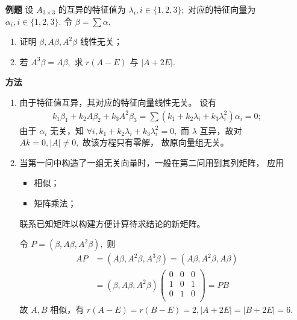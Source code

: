 \begin{itemize}
    \item[\textbf{例题}] 设 $ A_{3\times 3} $ 的互异的特征值为 $ \lambda_i,i\in\{1,2,3\}; $ 
    对应的特征向量为 $ \alpha_i,i\in\{1,2,3\}. $ 令 $ \beta = \sum \alpha, $ 
    \begin{enumerate}[label = \Roman*.]
        \item 证明 $ \beta,A\beta,A^2\beta $ 线性无关；
        \item 若 $ A^3\beta = A\beta, $ 求 $ r(A - E) $ 与 $ |A+2E|. $ 
    \end{enumerate}
    \item[\textbf{方法}] \begin{enumerate}[label = \Roman*.]
        \item 由于特征值互异，其对应的特征向量线性无关。
        设有
        \begin{equation*}
            \begin{aligned}
                k_1\beta_1 + k_2A\beta_2 + k_3A^2\beta_3
                = \sum(k_1 + k_2\lambda_i + k_3\lambda_i^2)\alpha_i = 0;
            \end{aligned}
        \end{equation*}
        由于 $ \alpha_i $ 无关，知 $ \forall i, k_1 + k_2\lambda_i + k_3\lambda_i^2 = 0, $ 
        而 $ \lambda $ 互异，故对 $ Ak = 0, |A|\neq 0, $ 故该方程只有零解，
        故原向量组无关。
        \item 当第一问中构造了一组无关向量时，一般在第二问用到其列矩阵，
        应用\begin{itemize}
            \item 相似；
            \item 矩阵乘法；
        \end{itemize}联系已知矩阵以构建方便计算待求结论的新矩阵。

        令 $ P = (\beta,A\beta,A^2\beta), $ 则
        \begin{equation*}
            \begin{aligned}
                AP &= (A\beta,A^2\beta,A^3\beta) = (A\beta,A^2\beta,A\beta) \\ 
                &= (\beta,A\beta,A^2\beta)\begin{pmatrix}
                    0&0&0\\1&0&1\\0&1&0\\
                \end{pmatrix} = PB
            \end{aligned}
        \end{equation*}
        故 $ A,B $ 相似，有 $ r(A-E) = r(B-E)=2,|A+2E| = |B+2E| = 6. $ 
    \end{enumerate}
\end{itemize}

